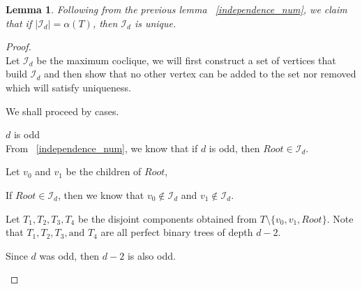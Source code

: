 \documentclass{article}
\newtheorem{lemma}[theorem]{Lemma}
\theoremstyle{definition}
\begin{document}
\begin{lemma}
	Following from the previous lemma ~\ref{independence_num}, we claim that if $|\mathcal{I}_d| = \alpha(T)$, then $\mathcal{I}_d$ is unique.
\end{lemma}
\begin{proof}
	$ $ \\
	Let $\mathcal{I}_d$ be the maximum coclique, we will first construct a set of vertices that build $\mathcal{I}_d$ and then show that no other vertex can be added to the set nor removed which will satisfy uniqueness.

	We shall proceed by cases.
	\begin{caseof}
		\item $d$ is odd \\
		From ~\ref{independence_num}, we know that if $d$ is odd, then $Root \in \mathcal{I}_d$.

		Let $v_0$ and $v_1$ be the children of $Root$,

		If $Root \in \mathcal{I}_d$, then we know that $v_0 \not\in \mathcal{I}_d$ and $v_1 \not\in \mathcal{I}_d$.

		Let $T_1, T_2, T_3, T_4$ be the disjoint components obtained from $T\setminus\{v_0, v_1, Root\}$. Note that $T_1, T_2, T_3, \text{and } T_4$ are all perfect binary trees of depth $d - 2$.

		Since $d$ was odd, then $d - 2$ is also odd.
	\end{caseof}
\end{proof}
\end{document}
